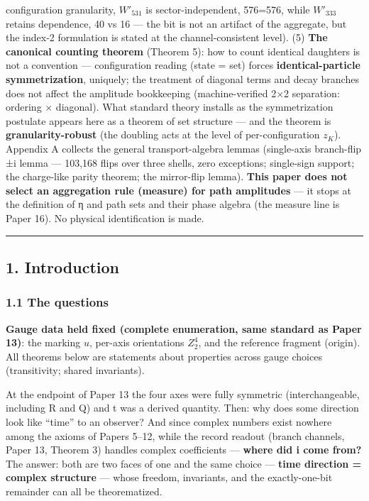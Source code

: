\documentclass[
]{article}
\begin{document}
configuration granularity, \(W'_{531}\) is sector-independent, 576=576,
while \(W'_{333}\) retains dependence, 40 vs 16 --- the bit is not an
artifact of the aggregate, but the index-2 formulation is stated at the
channel-consistent level). (5) \textbf{The canonical counting theorem}
(Theorem 5): how to count identical daughters is not a convention ---
configuration reading (state = set) forces \textbf{identical-particle
symmetrization}, uniquely; the treatment of diagonal terms and decay
branches does not affect the amplitude bookkeeping (machine-verified 2×2
separation: ordering × diagonal). What standard theory installs as the
symmetrization postulate appears here as a theorem of set structure ---
and the theorem is \textbf{granularity-robust} (the doubling acts at the
level of per-configuration \(z_K\)). Appendix A collects the general
transport-algebra lemmas (single-axis branch-flip ±i lemma --- 103,168
flips over three shells, zero exceptions; single-sign support; the
charge-like parity theorem; the mirror-flip lemma). \textbf{This paper
does not select an aggregation rule (measure) for path amplitudes} ---
it stops at the definition of η and path sets and their phase algebra
(the measure line is Paper 16). No physical identification is made.

\begin{center}\rule{0.5\linewidth}{0.5pt}\end{center}

\subsection{1. Introduction}\label{introduction}

\subsubsection{1.1 The questions}\label{the-questions}

\textbf{Gauge data held fixed (complete enumeration, same standard as
Paper 13)}: the marking \(u\), per-axis orientations \(Z_2^{4}\), and
the reference fragment (origin). All theorems below are statements about
properties across gauge choices (transitivity; shared invariants).

At the endpoint of Paper 13 the four axes were fully symmetric
(interchangeable, including R and Q) and t was a derived quantity. Then:
why does some direction look like ``time'' to an observer? And since
complex numbers exist nowhere among the axioms of Papers 5--12, while
the record readout (branch channels, Paper 13, Theorem 3) handles
complex coefficients --- \textbf{where did i come from?} The answer:
both are two faces of one and the same choice --- \textbf{time direction
= complex structure} --- whose freedom, invariants, and the
exactly-one-bit remainder can all be theorematized.
\end{document}
